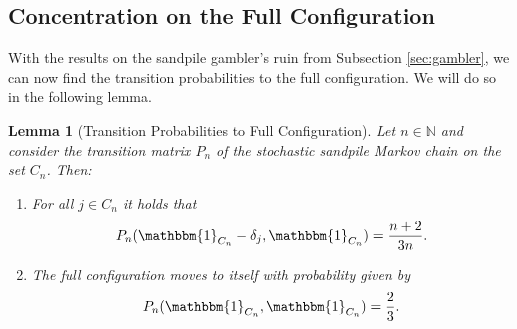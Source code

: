 \documentclass[11pt]{article}
\newtheorem{lemma}{Lemma}[section]
\newcommand{\N}{\mathbb{N}}
\newcommand{\one}{\mathbbm{1}}
\newcommand{\trans}[1]{P_{#1}}
\begin{document}
\subsection{Concentration on the Full Configuration}\label{sec:conc-on-full}
With the results on the sandpile gambler's ruin from Subsection \ref{sec:gambler}, we can now find the transition probabilities to the full configuration. We will do so in the following lemma.
\begin{lemma}[Transition Probabilities to Full Configuration]\label{lemma:transition-to-full}
    Let $n\in\N$ and consider the transition matrix $\trans{n}$ of the stochastic sandpile Markov chain on the set $C_n$. Then:
    \begin{enumerate}
        \item For all $j\in C_n$ it holds that$$\trans{n}(\one_{C_n}-\delta_j,\one_{C_n})=\frac{n+2}{3n}.$$
        \item The full configuration moves to itself with probability given by$$\trans{n}(\one_{C_n},\one_{C_n})=\frac{2}{3}.$$
    \end{enumerate}
\end{lemma}
\end{document}
